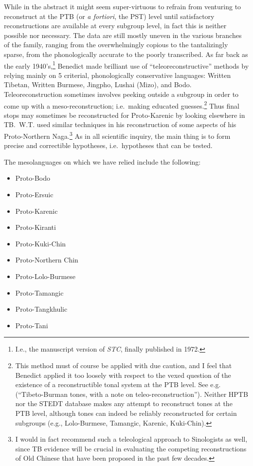 While in the abstract it might seem super-virtuous to refrain from venturing to reconstruct at the PTB (or {\it a fortiori}, the PST) level until satisfactory reconstructions are available at every subgroup level, in fact this is neither possible nor necessary. The data are still mostly uneven in the various branches of the family, ranging from the overwhelmingly copious to the tantalizingly sparse, from the phonologically accurate to the poorly transcribed. As far back as the early 1940’s,\footnote{I.e., the manuscript version of \textit{STC}, finally published in 1972.} Benedict made brilliant use of “teleoreconstructive” methods by relying mainly on 5 criterial, phonologically conservative languages: Written Tibetan, Written Burmese, Jingpho, Lushai (Mizo), and Bodo. Teleoreconstruction sometimes involves peeking outside a subgroup in order to come up with a meso-reconstruction; i.e.\ making educated guesses.\footnote{This method must of course be applied with due caution, and I feel that Benedict applied it too loosely with respect to the vexed question of the existence of a reconstructible tonal system at the PTB level. See e.g.\ \citealt{PKB-TBT} (“Tibeto-Burman tones, with a note on teleo-reconstruction”). Neither HPTB nor the STEDT database makes any attempt to reconstruct tones at the PTB level, although tones can indeed be reliably reconstructed for certain subgroups (e.g., Lolo-Burmese, Tamangic, Karenic, Kuki-Chin).} Thus final stops may sometimes be reconstructed for Proto-Karenic by looking elsewhere in TB.\ W.T. \citet{WTF-PNN} used similar techniques in his reconstruction of some aspects of his Proto-Northern Naga.\footnote{I would in fact recommend such a teleological approach to Sinologists as well, since TB evidence will be crucial in evaluating the competing reconstructions of Old Chinese that have been proposed in the past few decades.} As in all scientific inquiry, the main thing is to form precise and correctible hypotheses, i.e.\ hypotheses that can be tested.

The mesolanguages on which we have relied include the following:

\begin{itemize}

\item Proto-Bodo \citep{RB-PB}
\item Proto-Ersuic \citep{Yu2012}
\item Proto-Karenic \citep{H-RKC,H-STK,RBJ-KLS,RB-PKR,Theraphan2013,Solnitinprep,Shintaniinprep}
\item Proto-Kiranti \citep{BM-PK7}
\item Proto-Kuki-Chin \citep{KVB-PKC}
\item Proto-Northern Chin \citep{Button2011}
\item Proto-Lolo-Burmese \citep{RB-PLB,JAM-LPLB,JAM-TSR,JAM-TJLB,JAM-MLBM,JAM-Quo,JAM-LDTB,Matisoff2010f,DB-PLolo}
\item Proto-Tamangic \citep{MM-K78,MM-Thesis}
\item Proto-Tangkhulic \citep{DRM-Tk}
\item Proto-Tani \citep{JS-HCST}

\end{itemize}

